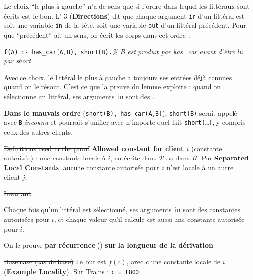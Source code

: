 \documentclass[10pt]{article}
\begin{document}
Le choix ``le plus à gauche'' n'a de sens que si l'ordre dans lequel les littéraux sont écrits est le bon.
L' 3 (\textbf{Directions}) dit que chaque argument \texttt{in} d'un littéral est soit
une variable \texttt{in} de la tête, soit une variable \texttt{out} d'un littéral précédent. Pour que
``précédent'' ait un sens, on écrit les corps dans cet ordre :
\begin{moi}
\texttt{f(A) :- has\_car(A,B), short(B).}\quad \textit{\% B est produit par has\_car avant d'être lu par short}
\end{moi}
Avec ce choix, le littéral le plus à gauche a toujours ses entrées déjà connues quand on le résout. C'est ce
que la preuve du lemme exploite : quand on sélectionne un littéral, ses arguments \texttt{in} sont des
.
\begin{piege}
\textbf{Dans le mauvais ordre} (\texttt{short(B), has\_car(A,B)}), \texttt{short(B)} serait appelé avec
\texttt{B} \emph{inconnu} et pourrait s'unifier avec n'importe quel fait \texttt{short(\ldots)}, y compris
ceux des autres clients.
\end{piege}


\st{Definitions used in the proof}
\textbf{Allowed constant for client $i$} (constante autorisée) : une constante locale à $i$, ou écrite dans
$\mathcal{R}$ ou dans $H$. Par \textbf{Separated Local Constants}, aucune constante autorisée pour $i$ n'est
locale à un autre client $j$.

\st{Invariant}
\begin{dire}
Chaque fois qu'un littéral est sélectionné, ses arguments \texttt{in} sont des constantes autorisées pour $i$,
et chaque valeur qu'il calcule est aussi une constante autorisée pour $i$.
\end{dire}
On le prouve \textbf{par récurrence} () \textbf{sur la longueur de la dérivation}.

\st{Base case (cas de base)}
Le but est $f(c)$, avec $c$ une constante locale de $i$ (\textbf{Example Locality}). Sur Trains : \texttt{c = t800}.
\end{document}

